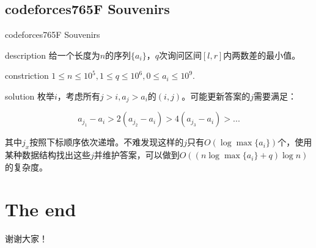\documentclass{beamer}
\begin{document}
	\subsection{codeforces765F Souvenirs}
	\begin{frame}{codeforces765F Souvenirs}
		\begin{block}{description}
			给一个长度为$n$的序列$\{a_i\}$，$q$次询问区间$[l,r]$内两数差的最小值。
		\end{block}
		\begin{block}{constriction}
			$1 \le n \le 10^5, 1 \le q \le 10^6, 0 \le a_i \le 10^9.$
		\end{block}
		\pause
		\begin{block}{solution}
			枚举$i$，考虑所有$j>i,a_j>a_i$的$(i,j)$。可能更新答案的$j$需要满足：
			
			$$a_{j_1}-a_i>2(a_{j_2}-a_i)>4(a_{j_3}-a_i)>...$$
			
			其中$j_x$按照下标顺序依次递增。不难发现这样的$j$只有$O(\log \max\{a_i\})$个，使用某种数据结构找出这些$j$并维护答案，可以做到$O((n\log \max\{a_i\}+q)\log n)$的复杂度。
		\end{block}
	\end{frame}
	\section{The end}
	\begin{frame}{}
		\begin{center}
			{\Huge 谢谢大家！}
		\end{center}
	\end{frame}
\end{document}

